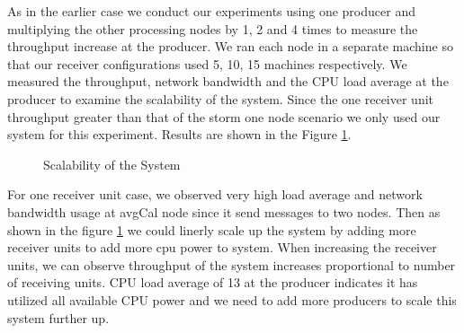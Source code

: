 As in the earlier case we conduct our experiments using one producer and multiplying the other processing nodes by 1, 2 and 4 times to measure the throughput increase at the producer. We ran each node in a separate machine so that our receiver configurations used 5, 10, 15 machines respectively. We measured the throughput,  network bandwidth and the CPU load average at the producer to examine the scalability of the system. Since the one receiver unit throughput greater than that of the storm one node scenario we only used our system for this experiment.  Results are shown in the Figure \ref{scalability}.


\begin{figure}[!t]
        \centering
        \hfil
        \hfil
        \hfil
        \caption{Scalability of the System}
        \label{scalability}
\end{figure}


For one receiver unit case, we observed very high load average and network bandwidth usage at avgCal node since it send messages to two nodes. Then as shown in the figure \ref{scalability} we could linerly scale up the system by adding more receiver units to add more cpu power to system. When increasing the receiver units, we can observe throughput of the system increases proportional to number of receiving units. CPU load average of 13 at the producer indicates it has utilized all available CPU power and we need to add more producers to scale this system further up. 


